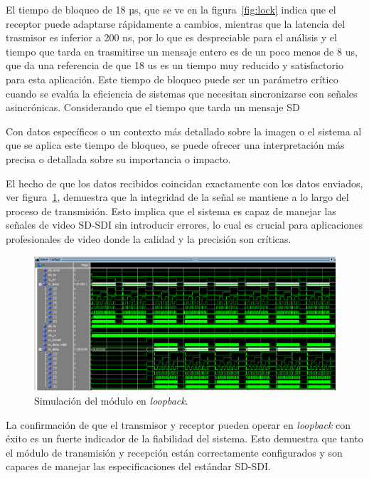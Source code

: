   El tiempo de bloqueo de 18 µs, que se ve en la figura~\ref{fig:lock} indica que el receptor puede adaptarse
  rápidamente a cambios, mientras que la latencia del trasmisor es inferior a 200 ns,
  por lo que es despreciable para el análisis y el tiempo que tarda en trasmitirse
  un mensaje entero es de un poco menos de 8 us, que da una referencia de que
  18 us es un tiempo muy reducido y satisfactorio para esta aplicación.
  Este tiempo de bloqueo puede ser un parámetro crítico
  cuando se evalúa la eficiencia de sistemas que necesitan sincronizarse con
  señales asincrónicas. Considerando que el tiempo que tarda un mensaje SD

  Con datos específicos o un contexto más detallado sobre la imagen o el
  sistema al que se aplica este tiempo de bloqueo, se puede ofrecer una interpretación
  más precisa o detallada sobre su importancia o impacto.

  El hecho de que los datos recibidos coincidan exactamente con los datos enviados,
  ver figura~\ref{fig:sd-full}, demuestra que la integridad de la señal se mantiene
  a lo largo del proceso de transmisión. Esto implica que el sistema es capaz de
  manejar las señales de video SD-SDI sin introducir errores, lo cual es crucial
  para aplicaciones profesionales de video donde la calidad y la precisión son críticas.

  \begin{figure}[h]
    \centering
    \includegraphics[width=1\textwidth]{./Figures/sdi_sd_full.png}
    \caption{Simulación del módulo en \textit{loopback}.}\label{fig:sd-full}
  \end{figure}

  La confirmación de que el transmisor y receptor pueden operar en \textit{loopback}
  con éxito es un fuerte indicador de la fiabilidad del sistema. Esto demuestra que
  tanto el módulo de transmisión y recepción están correctamente configurados y son
  capaces de manejar las especificaciones del estándar SD-SDI\@.

